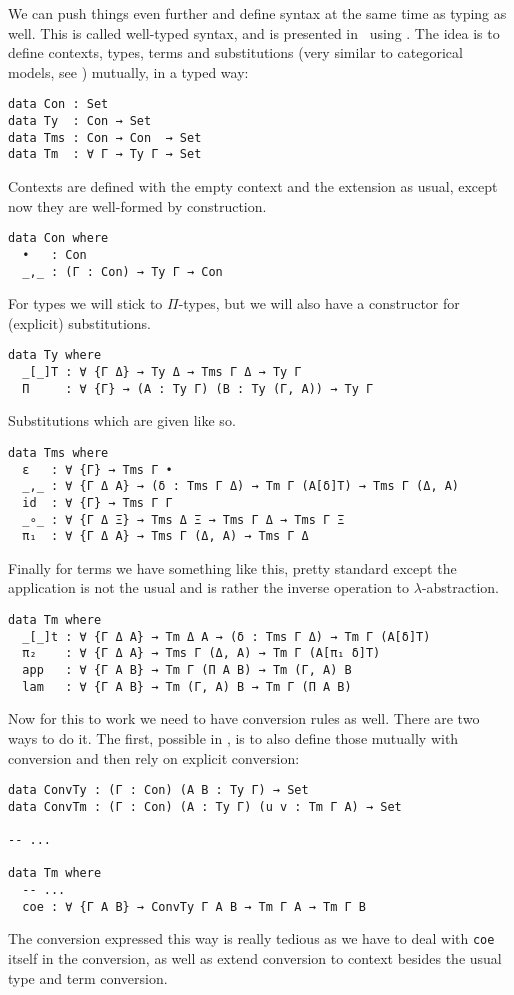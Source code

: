 We can push things even further and define syntax at the same time as typing
as well. This is called well-typed syntax, and is presented
in~ using .
The idea is to define contexts, types, terms and substitutions (very similar to
categorical models, see ) mutually, in a typed way:
\begin{verbatim}
data Con : Set
data Ty  : Con → Set
data Tms : Con → Con  → Set
data Tm  : ∀ Γ → Ty Γ → Set
\end{verbatim}
Contexts are defined with the empty context and the extension as usual, except
now they are well-formed by construction.
\begin{verbatim}
data Con where
  •   : Con
  _,_ : (Γ : Con) → Ty Γ → Con
\end{verbatim}
For types we will stick to \(\Pi\)-types, but we will also have a constructor
for (explicit) substitutions.
\begin{verbatim}
data Ty where
  _[_]T : ∀ {Γ Δ} → Ty Δ → Tms Γ Δ → Ty Γ
  Π     : ∀ {Γ} → (A : Ty Γ) (B : Ty (Γ, A)) → Ty Γ
\end{verbatim}
Substitutions which are given like so.
\begin{verbatim}
data Tms where
  ε   : ∀ {Γ} → Tms Γ •
  _,_ : ∀ {Γ Δ A} → (δ : Tms Γ Δ) → Tm Γ (A[δ]T) → Tms Γ (Δ, A)
  id  : ∀ {Γ} → Tms Γ Γ
  _∘_ : ∀ {Γ Δ Ξ} → Tms Δ Ξ → Tms Γ Δ → Tms Γ Ξ
  π₁  : ∀ {Γ Δ A} → Tms Γ (Δ, A) → Tms Γ Δ
\end{verbatim}
Finally for terms we have something like this, pretty standard except the
application is not the usual and is rather the inverse operation to
\(\lambda\)-abstraction.
\begin{verbatim}
data Tm where
  _[_]t : ∀ {Γ Δ A} → Tm Δ A → (δ : Tms Γ Δ) → Tm Γ (A[δ]T)
  π₂    : ∀ {Γ Δ A} → Tms Γ (Δ, A) → Tm Γ (A[π₁ δ]T)
  app   : ∀ {Γ A B} → Tm Γ (Π A B) → Tm (Γ, A) B
  lam   : ∀ {Γ A B} → Tm (Γ, A) B → Tm Γ (Π A B)
\end{verbatim}

Now for this to work we need to have conversion rules as well. There are two
ways to do it. The first, possible in \Agda, is to also define those mutually
with conversion and then rely on explicit conversion:
\begin{verbatim}
data ConvTy : (Γ : Con) (A B : Ty Γ) → Set
data ConvTm : (Γ : Con) (A : Ty Γ) (u v : Tm Γ A) → Set

-- ...

data Tm where
  -- ...
  coe : ∀ {Γ A B} → ConvTy Γ A B → Tm Γ A → Tm Γ B
\end{verbatim}
The conversion expressed this way is really tedious as we have to deal with
\texttt{coe} itself in the conversion, as well as extend conversion to
context besides the usual type and term conversion.

